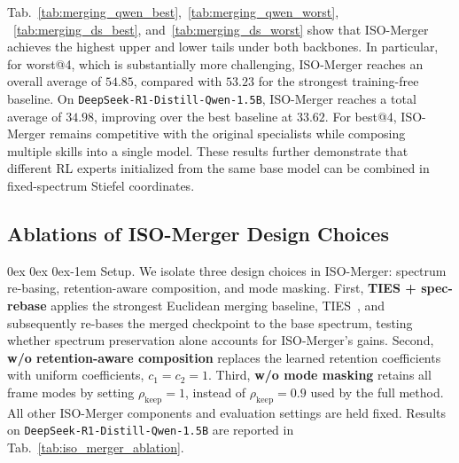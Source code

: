 \documentclass[11pt, a4paper]{utda}
\makeatletter
\renewcommand{\paragraph}{%
  \@startsection{paragraph}{4}%
  {\z@}{0ex \@plus 0ex \@minus 0ex}{-1em}%
  {\normalfont\normalsize\bfseries}%
}
\theoremstyle{plain}
\theoremstyle{definition}
\theoremstyle{remark}
\makeatother
\begin{document}
Tab.~\ref{tab:merging_qwen_best},~\ref{tab:merging_qwen_worst},
~\ref{tab:merging_ds_best}, and~\ref{tab:merging_ds_worst} show that
ISO-Merger achieves the highest upper and lower tails under both backbones.
In particular, for worst@4, which is substantially more challenging,
ISO-Merger reaches an overall average of $54.85$, compared with $53.23$ for
the strongest training-free baseline. On
\texttt{DeepSeek-R1-Distill-Qwen-1.5B}, ISO-Merger reaches a total average of
$34.98$, improving over the best baseline at $33.62$. For best@4, ISO-Merger
remains competitive with the original specialists while composing multiple
skills into a single model. These results further demonstrate that different
RL experts initialized from the same base model can be combined in
fixed-spectrum Stiefel coordinates.


\subsection{Ablations of ISO-Merger Design Choices}
\label{app:iso_merger_ablate}

\paragraph{Setup.}
We isolate three design choices in ISO-Merger: spectrum re-basing,
retention-aware composition, and mode masking.
First, \textbf{TIES + spec-rebase} applies the strongest Euclidean
merging baseline, TIES~\cite{ties}, and subsequently re-bases the
merged checkpoint to the base spectrum, testing whether spectrum
preservation alone accounts for ISO-Merger's gains.
Second, \textbf{w/o retention-aware composition} replaces the learned
retention coefficients with uniform coefficients, $c_1=c_2=1$.
Third, \textbf{w/o mode masking} retains all frame modes by setting
$\rho_{\mathrm{keep}}=1$, instead of $\rho_{\mathrm{keep}}=0.9$
used by the full method.
All other ISO-Merger components and evaluation settings are held fixed.
Results on \texttt{DeepSeek-R1-Distill-Qwen-1.5B} are reported in
Tab.~\ref{tab:iso_merger_ablation}.
\end{document}
